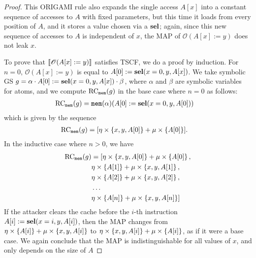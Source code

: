 \begin{proof}
    This ORIGAMI rule also expands the single access $A[x]$ into a constant sequence of accesses to $A$ with fixed parameters, but this time it loads from every position of $A$, and it stores a value chosen via a $\textbf{sel}$; again, since this new sequence of accesses to $A$ is independent of $x$, the MAP of $\mathscr{O}(A[x]:=y)$ does not leak $x$. 

    To prove that $\llbracket \mathscr{O}(A[x]:=y)\rrbracket$ satisfies TSCF, we do a proof by induction.
    For $n=0$, $\mathscr{O}(A[x]:=y)$ is equal to $A[0]:=\textbf{sel}(x=0,y,A[x])$. We take symbolic GS $g=\alpha\cdot A[0]:=\textbf{sel}(x=0,y,A[x])\cdot \beta$, where $\alpha$ and $\beta$ are symbolic variables for atoms, and we compute $\text{RC}_{\texttt{mem}}(g)$ in the base case where $n=0$ as follows:
    \begin{align*}
        \text{RC}_{\texttt{mem}}(g)
        &=\texttt{mem}(\alpha)(A[0]:=\textbf{sel}(x=0,y,A[0]))
    \end{align*}
which is given by the sequence
    \begin{align*}
        \text{RC}_{\texttt{mem}}(g)&=[\eta\times\left\{x,y,A[0]\right\}+\mu\times \left\{A[0]\right\}].
    \end{align*}
In the inductive case where $n>0$, we have
    \begin{align*}
        \text{RC}_{\texttt{mem}}(g)&=[\eta\times\left\{x,y,A[0]\right\}+\mu\times \left\{A[0]\right\},\\
        &\eta\times\left\{A[1]\right\}+\mu\times \left\{x,y,A[1]\right\},\\
        &\eta\times\left\{A[2]\right\}+\mu\times \left\{x,y,A[2]\right\},\\
        &\ldots\\
        &\eta\times\left\{A[n]\right\}+\mu\times \left\{x,y,A[n]\right\}]
    \end{align*}
If the attacker clears the cache before the $i$-th instruction $A[i]:=\textbf{sel}(x=i,y,A[i])$, then the MAP changes from $\eta\times\left\{A[i]\right\}+\mu\times \left\{x,y,A[i]\right\}$ to $\eta\times\left\{x,y,A[i]\right\}+\mu\times \left\{A[i]\right\}$, as if it were a base case. We again conclude that the MAP is indistinguishable for all values of $x$, and only depends on the size of $A$
%     
    
\end{proof}



